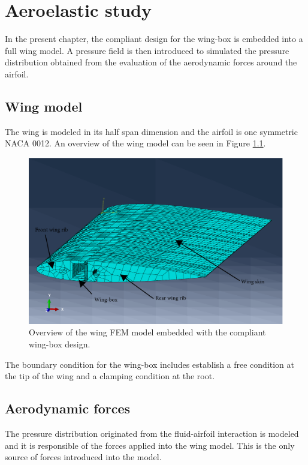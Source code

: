 \chapter{Aeroelastic study} \label{chap:aeroelastic}

  In the present chapter, the compliant design for the wing-box is embedded into a full wing model. A pressure field is then introduced to simulated the pressure distribution obtained from the evaluation of the aerodynamic forces around the airfoil.

  \section{Wing model} \label{sec:wingModel_aeroelastic}

    The wing is modeled in its half span dimension and the airfoil is one symmetric NACA 0012. An overview of the wing model can be seen in Figure \ref{fig:wing}.

    \begin{figure}[!htpb]
      \centering
      \includegraphics[width=0.8 \textwidth]{figures/wing-model/wing}
      \caption[Overview of the wing FEM model embedded with the compliant wing-box design]{Overview of the wing FEM model embedded with the compliant wing-box design.}
      \label{fig:wing}
    \end{figure}
    
    The boundary condition for the wing-box includes establish a free condition at the tip of the wing and a clamping condition at the root.

  \section{Aerodynamic forces} \label{sec:aerodynamic_aeroelastic}

    The pressure distribution originated from the fluid-airfoil interaction is modeled and it is responsible of the forces applied into the wing model. This is the only source of forces introduced into the model.